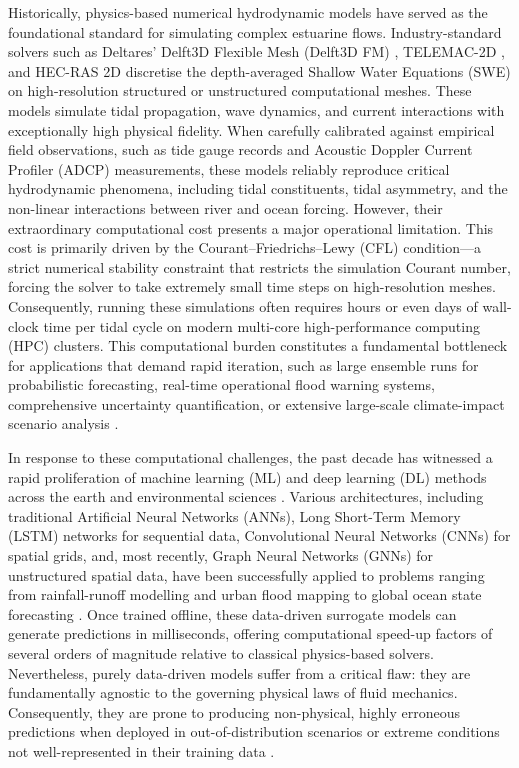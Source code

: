 Historically, physics-based numerical hydrodynamic models have served as the
foundational standard for simulating complex estuarine flows. Industry-standard solvers such as Deltares'
Delft3D Flexible Mesh (Delft3D FM) \cite{Delft3DFM2011}, TELEMAC-2D \cite{Hervouet2000},
and HEC-RAS 2D \cite{Quirogaetal2020} discretise the depth-averaged
Shallow Water Equations (SWE) on high-resolution structured or unstructured computational
meshes. These models simulate tidal propagation, wave dynamics, and current interactions with exceptionally high physical fidelity. When
carefully calibrated against empirical field observations, such as tide gauge records and Acoustic Doppler Current Profiler (ADCP) measurements, these models reliably
reproduce critical hydrodynamic phenomena, including tidal constituents, tidal asymmetry, and the non-linear
interactions between river and ocean forcing. However, their extraordinary computational cost presents a major operational limitation. This cost is primarily driven by the Courant--Friedrichs--Lewy (CFL) condition---a strict numerical stability constraint that restricts the simulation Courant number, forcing the solver to take extremely small time steps on high-resolution meshes. Consequently, running these simulations often requires hours or even days of
wall-clock time per tidal cycle on modern multi-core high-performance computing (HPC)
clusters. This computational burden constitutes a fundamental bottleneck for applications that
demand rapid iteration, such as large ensemble runs for probabilistic forecasting, real-time operational flood warning systems, comprehensive uncertainty
quantification, or extensive large-scale climate-impact scenario analysis
\cite{Bates2010, Brunton2020}.

In response to these computational challenges, the past decade has witnessed a rapid proliferation of machine learning (ML)
and deep learning (DL) methods across the earth and environmental sciences
\cite{LeCun2015, Reichstein2019, Shen2018}. Various architectures, including traditional Artificial Neural Networks (ANNs),
Long Short-Term Memory (LSTM) networks for sequential data, Convolutional Neural Networks (CNNs) for spatial grids, and,
most recently, Graph Neural Networks (GNNs) for unstructured spatial data, have been successfully applied to problems
ranging from rainfall-runoff modelling and urban flood mapping to global ocean state
forecasting \cite{Sit2020, Bentivoglio2023}. Once trained offline, these
data-driven surrogate models can generate predictions in milliseconds,
offering computational speed-up factors of several orders of magnitude relative to
classical physics-based solvers. Nevertheless, purely data-driven models suffer from a critical flaw: they are fundamentally agnostic to the governing physical laws of fluid mechanics. Consequently, they are prone to producing non-physical, highly erroneous predictions when deployed in out-of-distribution scenarios or extreme conditions not well-represented in their training data \cite{Karniadakis2021, Cuomo2022}.

